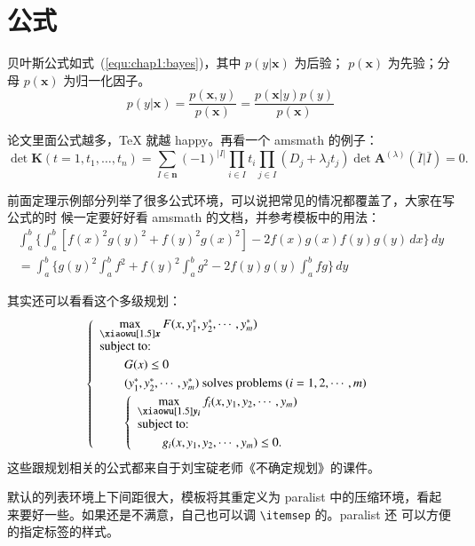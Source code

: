 \section{公式}
\label{sec:equation}
贝叶斯公式如式~(\ref{equ:chap1:bayes})，其中 $p(y|\mathbf{x})$ 为后验；
$p(\mathbf{x})$ 为先验；分母 $p(\mathbf{x})$ 为归一化因子。
\begin{equation}
\label{equ:chap1:bayes}
p(y|\mathbf{x}) = \frac{p(\mathbf{x},y)}{p(\mathbf{x})}=
\frac{p(\mathbf{x}|y)p(y)}{p(\mathbf{x})} 
\end{equation}

论文里面公式越多，\TeX{} 就越 happy。再看一个 \textsf{amsmath} 的例子：
\newcommand{\envert}[1]{\left\lvert#1\right\rvert} 
\begin{equation}\label{detK2}
\det\mathbf{K}(t=1,t_1,\dots,t_n)=\sum_{I\in\mathbf{n}}(-1)^{\envert{I}}
\prod_{i\in I}t_i\prod_{j\in I}(D_j+\lambda_jt_j)\det\mathbf{A}
^{(\lambda)}(\overline{I}|\overline{I})=0.
\end{equation} 

前面定理示例部分列举了很多公式环境，可以说把常见的情况都覆盖了，大家在写公式的时
候一定要好好看 \textsf{amsmath} 的文档，并参考模板中的用法：
\begin{multline*}%
\int_a^b\biggl\{\int_a^b[f(x)^2g(y)^2+f(y)^2g(x)^2]
 -2f(x)g(x)f(y)g(y)\,dx\biggr\}\,dy \\
 =\int_a^b\biggl\{g(y)^2\int_a^bf^2+f(y)^2
  \int_a^b g^2-2f(y)g(y)\int_a^b fg\biggr\}\,dy
\end{multline*}

其实还可以看看这个多级规划：
\begin{equation}\label{bilevel}
\left\{\begin{array}{l}
\max\limits_{{\mbox{\footnotesize\boldmath $x$}}} F(x,y_1^*,y_2^*,\cdots,y_m^*)\\[0.2cm]
\mbox{subject to:}\\[0.1cm]
\qquad G(x)\le 0\\[0.1cm]
\qquad(y_1^*,y_2^*,\cdots,y_m^*)\mbox{ solves problems }(i=1,2,\cdots,m)\\[0.1cm]
\qquad\left\{\begin{array}{l}
    \max\limits_{{\mbox{\footnotesize\boldmath $y_i$}}}f_i(x,y_1,y_2,\cdots,y_m)\\[0.2cm]
    \mbox{subject to:}\\[0.1cm]
    \qquad g_i(x,y_1,y_2,\cdots,y_m)\le 0.
    \end{array}\right.
\end{array}\right.
\end{equation}
这些跟规划相关的公式都来自于刘宝碇老师《不确定规划》的课件。

默认的列表环境上下间距很大，模板将其重定义为 \textsf{paralist} 中的压缩环境，看起
来要好一些。如果还是不满意，自己也可以调 \verb|\itemsep| 的。\textsf{paralist} 还
可以方便的指定标签的样式。


